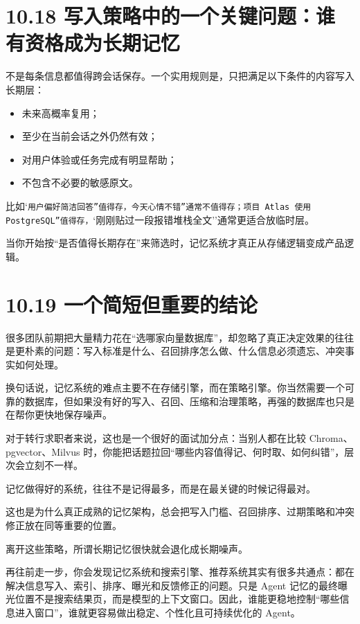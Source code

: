 \section{10.18 写入策略中的一个关键问题：谁有资格成为长期记忆}

不是每条信息都值得跨会话保存。一个实用规则是，只把满足以下条件的内容写入长期层：


\begin{itemize}[leftmargin=2em]
\item 未来高概率复用；
\item 至少在当前会话之外仍然有效；
\item 对用户体验或任务完成有明显帮助；
\item 不包含不必要的敏感原文。
\end{itemize}

比如`\texttt{用户偏好简洁回答''值得存，}\texttt{今天心情不错''通常不值得存；}\texttt{项目 Atlas 使用 PostgreSQL''值得存，}`刚刚贴过一段报错堆栈全文''通常更适合放临时层。


当你开始按``是否值得长期存在''来筛选时，记忆系统才真正从存储逻辑变成产品逻辑。


\section{10.19 一个简短但重要的结论}

很多团队前期把大量精力花在``选哪家向量数据库''，却忽略了真正决定效果的往往是更朴素的问题：写入标准是什么、召回排序怎么做、什么信息必须遗忘、冲突事实如何处理。

换句话说，记忆系统的难点主要不在存储引擎，而在策略引擎。你当然需要一个可靠的数据库，但如果没有好的写入、召回、压缩和治理策略，再强的数据库也只是在帮你更快地保存噪声。


对于转行求职者来说，这也是一个很好的面试加分点：当别人都在比较 Chroma、pgvector、Milvus 时，你能把话题拉回``哪些内容值得记、何时取、如何纠错''，层次会立刻不一样。

记忆做得好的系统，往往不是记得最多，而是在最关键的时候记得最对。

这也是为什么真正成熟的记忆架构，总会把写入门槛、召回排序、过期策略和冲突修正放在同等重要的位置。

离开这些策略，所谓长期记忆很快就会退化成长期噪声。

再往前走一步，你会发现记忆系统和搜索引擎、推荐系统其实有很多共通点：都在解决信息写入、索引、排序、曝光和反馈修正的问题。只是 Agent 记忆的最终曝光位置不是搜索结果页，而是模型的上下文窗口。因此，谁能更稳地控制``哪些信息进入窗口''，谁就更容易做出稳定、个性化且可持续优化的 Agent。

